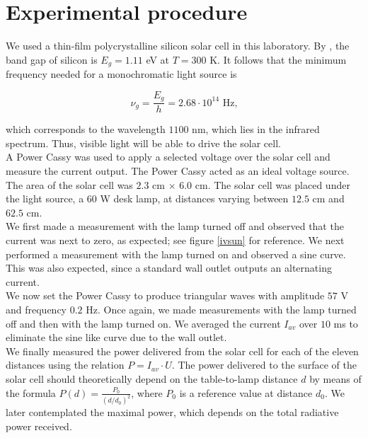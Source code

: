 \documentclass[12pt,a4paper]{article}
\begin{document}
\section{Experimental procedure}

We used a thin-film polycrystalline silicon solar cell in this laboratory. By \cite{kittle}, the band gap of silicon is $E_g = 1.11$ eV at $T = 300$ K. It follows that the minimum frequency needed for a monochromatic light source is

$$\nu_g = \frac{E_g}{h} = 2.68 \cdot 10^{14}\text{ Hz,}$$

which corresponds to the wavelength $1100$ nm, which lies in the infrared spectrum. Thus, visible light will be able to drive the solar cell. \\

A Power Cassy was used to apply a selected voltage over the solar cell and measure the current output. The Power Cassy acted as an ideal voltage source. The area of the solar cell was $2.3$ cm $\times$ $6.0$ cm. The solar cell was placed under the light source, a $60$ W desk lamp, at distances varying between $12.5$ cm and $62.5$ cm. \\

We first made a measurement with the lamp turned off and observed that the current was next to zero, as expected; see figure \ref{ivsun} for reference. We next performed a measurement with the lamp turned on and observed a sine curve. This was also expected, since a standard wall outlet outputs an alternating current. \\

We now set the Power Cassy to produce triangular waves with amplitude $57$ V and frequency $0.2$ Hz. Once again, we made measurements with the lamp turned off and then with the lamp turned on. We averaged the current $I_{av}$ over $10$ ms to eliminate the sine like curve due to the wall outlet. \\

We finally measured the power delivered from the solar cell for each of the eleven distances using the relation $P = I_{av} \cdot U$. The power delivered to the surface of the solar cell should theoretically depend on the table-to-lamp distance $d$ by means of the formula $P(d) = \frac{P_0}{(d/d_0)^2}$, where $P_0$ is a reference value at distance $d_0$. We later contemplated the maximal power, which depends on the total radiative power received.
\end{document}
